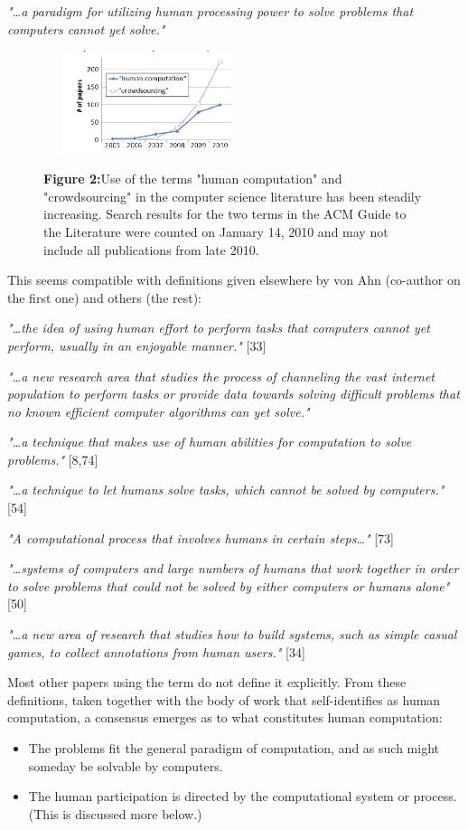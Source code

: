 \documentclass{acm_proc_article-sp}
\begin{document}
\textit{"\dots a paradigm for utilizing human processing power to solve problems that computers cannot yet solve."}
\begin{figure}[h]
\includegraphics[width=6cm,height=3cm]{graf2}

\textbf{Figure 2:}Use of the terms "human computation" and "crowdsourcing" in the computer science literature has been steadily increasing. Search results for the two terms in the ACM Guide to the Literature were counted on January 14, 2010 and may not include all publications from late 2010.
\end{figure}

This seems compatible with definitions given elsewhere by von Ahn (co-author on the first one) and others (the rest):

\textit{"\dots the idea of using human effort to perform tasks that computers cannot yet perform, usually in an enjoyable manner."} [33]

\textit{"\dots a new research area that studies the process of channeling the vast internet population to perform tasks or provide data towards solving 
difficult problems that no known efficient computer algorithms can yet solve." }~\cite{chandrasekar2010}

\textit{"\dots a technique that makes use of human abilities for computation to solve problems." }[8,74]

\textit{"\dots a technique to let humans solve tasks, which cannot be solved by computers."} [54]

\textit{"A computational process that involves humans in certain steps\dots "} [73]

\textit{"\dots systems of computers and large numbers of humans that work together in order to solve problems that could not be solved by either computers or humans alone"} [50]

\textit{"\dots a new area of research that studies how to build systems, such as simple casual games, to collect annotations from human users."} [34]

Most other papers using the term do not define it explicitly. From these definitions, taken together with the body of work that self-identifies as human computation, a consensus emerges as to what constitutes human computation:
\begin{itemize}
  \item  The problems fit the general paradigm of computation, and as such might someday be solvable by computers.
  \item The human participation is directed by the computational system or process. (This is discussed more below.)
\end{itemize}
\end{document}
